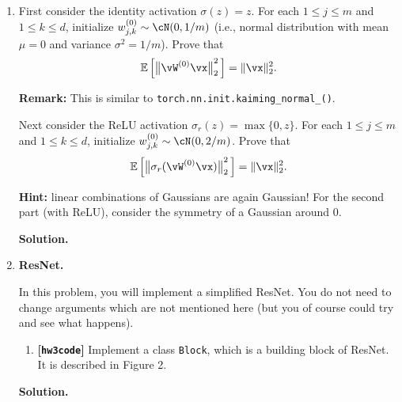 \documentclass{article}
\def\hwcode{\textbf{[\texttt{hw3code}]}\xspace}
\theoremstyle{definition}
\theoremstyle{remark}
\newenvironment{Q}
{%
\clearpage
\item
}
{%
\phantom{s}%
\bigskip%
\noindent\textbf{Solution.}
}
\begin{document}
\begin{enumerate}[font={\Large\bfseries},leftmargin=0pt]
\begin{Q}
\begin{enumerate}
        First consider the identity activation $\sigma(z)=z$. For each $1\le j\le m$ and $1\le k\le d$, initialize $w_{j,k}^{(0)}\sim\cN(0,1/m)$ (i.e., normal distribution with mean $\mu=0$ and variance $\sigma^2=1/m$).
        Prove that
        \begin{align*}
            \mathbb{E}\sbr[2]{\,\enVert[1]{\vW^{(0)}\vx}_2^2\,}=\|\vx\|_2^2.
        \end{align*}

        \textbf{Remark:} This is similar to \texttt{torch.nn.init.kaiming\_normal\_()}.

        Next consider the ReLU activation $\sigma_r(z)=\max\{0,z\}$. For each $1\le j\le m$ and $1\le k\le d$, initialize $w_{j,k}^{(0)}\sim\cN(0,2/m)$. Prove that
        \begin{align*}
            \mathbb{E}\sbr[2]{\,\enVert[1]{\sigma_r(\vW^{(0)}\vx)}_2^2\,}=\|\vx\|_2^2.
        \end{align*}

        \textbf{Hint:} linear combinations of Gaussians are again Gaussian!
        For the second part (with ReLU), consider the symmetry of a Gaussian around 0.
    \end{enumerate}
\end{Q}

\begin{Q}
    \textbf{ResNet.}

    In this problem, you will implement a simplified ResNet. You do not need to change arguments which are not mentioned here (but you of course could try and see what happens).
    \begin{enumerate}
        \item \hwcode Implement a class \texttt{Block}, which is a building block of ResNet. It is described in \citep{resnet} Figure 2.


\end{enumerate}
\end{Q}
\end{enumerate}
\end{document}
